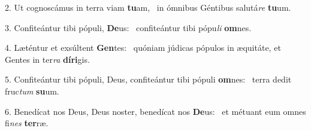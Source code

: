 2. Ut cognoscámus in terra viam \textbf{tu}am, \ast\  in ómnibus Géntibus salutá\textit{re} \textbf{tu}um.\

3. Confiteántur tibi pópuli, \textbf{De}us: \ast\  confiteántur tibi pópu\textit{li} \textbf{om}nes.\

4. Læténtur et exsúltent \textbf{Gen}tes: \ast\  quóniam júdicas pópulos in æquitáte, et Gentes in ter\textit{ra} \textbf{dí}\textbf{ri}gis.\

5. Confiteántur tibi pópuli, Deus, confiteántur tibi pópuli \textbf{om}nes: \ast\  terra dedit fruc\textit{tum} \textbf{su}um.\

6. Benedícat nos Deus, Deus noster, benedícat nos \textbf{De}us: \ast\  et métuant eum omnes fi\textit{nes} \textbf{ter}ræ.\

